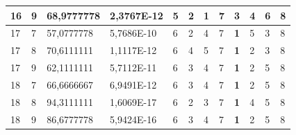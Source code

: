 \documentclass[conference]{IEEEtran}
\begin{document}
\begin{table}[]
\begin{tabular}{|llll|llllllll|}
		\multicolumn{1}{|l|}{16}  & \multicolumn{1}{l|}{9}         & \multicolumn{1}{l|}{68,9777778}    & 2,3767E-12 & \multicolumn{1}{l|}{5}   & \multicolumn{1}{l|}{2}          & \multicolumn{1}{l|}{\textbf{1}} & \multicolumn{1}{l|}{7}          & \multicolumn{1}{l|}{3}          & \multicolumn{1}{l|}{4}          & \multicolumn{1}{l|}{6}   & 8                      \\ \hline
		\multicolumn{1}{|l|}{17}  & \multicolumn{1}{l|}{7}         & \multicolumn{1}{l|}{57,0777778}    & 5,7686E-10 & \multicolumn{1}{l|}{6}   & \multicolumn{1}{l|}{2}          & \multicolumn{1}{l|}{4}          & \multicolumn{1}{l|}{7}          & \multicolumn{1}{l|}{\textbf{1}} & \multicolumn{1}{l|}{5}          & \multicolumn{1}{l|}{3}   & 8                      \\ \hline
		\multicolumn{1}{|l|}{17}  & \multicolumn{1}{l|}{8}         & \multicolumn{1}{l|}{70,6111111}    & 1,1117E-12 & \multicolumn{1}{l|}{6}   & \multicolumn{1}{l|}{4}          & \multicolumn{1}{l|}{5}          & \multicolumn{1}{l|}{7}          & \multicolumn{1}{l|}{\textbf{1}} & \multicolumn{1}{l|}{2}          & \multicolumn{1}{l|}{3}   & 8                      \\ \hline
		\multicolumn{1}{|l|}{17}  & \multicolumn{1}{l|}{9}         & \multicolumn{1}{l|}{62,1111111}    & 5,7112E-11 & \multicolumn{1}{l|}{6}   & \multicolumn{1}{l|}{3}          & \multicolumn{1}{l|}{4}          & \multicolumn{1}{l|}{7}          & \multicolumn{1}{l|}{\textbf{1}} & \multicolumn{1}{l|}{2}          & \multicolumn{1}{l|}{5}   & 8                      \\ \hline
		\multicolumn{1}{|l|}{18}  & \multicolumn{1}{l|}{7}         & \multicolumn{1}{l|}{66,6666667}    & 6,9491E-12 & \multicolumn{1}{l|}{6}   & \multicolumn{1}{l|}{3}          & \multicolumn{1}{l|}{4}          & \multicolumn{1}{l|}{7}          & \multicolumn{1}{l|}{\textbf{1}} & \multicolumn{1}{l|}{2}          & \multicolumn{1}{l|}{5}   & 8                      \\ \hline
		\multicolumn{1}{|l|}{18}  & \multicolumn{1}{l|}{8}         & \multicolumn{1}{l|}{94,3111111}    & 1,6069E-17 & \multicolumn{1}{l|}{6}   & \multicolumn{1}{l|}{2}          & \multicolumn{1}{l|}{3}          & \multicolumn{1}{l|}{7}          & \multicolumn{1}{l|}{\textbf{1}} & \multicolumn{1}{l|}{4}          & \multicolumn{1}{l|}{5}   & 8                      \\ \hline
		\multicolumn{1}{|l|}{18}  & \multicolumn{1}{l|}{9}         & \multicolumn{1}{l|}{86,6777778}    & 5,9424E-16 & \multicolumn{1}{l|}{6}   & \multicolumn{1}{l|}{3}          & \multicolumn{1}{l|}{4}          & \multicolumn{1}{l|}{7}          & \multicolumn{1}{l|}{\textbf{1}} & \multicolumn{1}{l|}{2}          & \multicolumn{1}{l|}{5}   & 8                      \\ \hline

\end{tabular}
\end{table}
\end{document}
